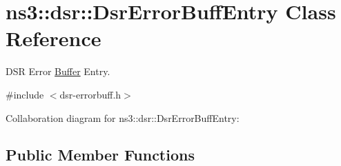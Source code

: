 \hypertarget{classns3_1_1dsr_1_1DsrErrorBuffEntry}{}\section{ns3\+:\+:dsr\+:\+:Dsr\+Error\+Buff\+Entry Class Reference}
\label{classns3_1_1dsr_1_1DsrErrorBuffEntry}


D\+SR Error \hyperlink{classns3_1_1Buffer}{Buffer} Entry.  




{\ttfamily \#include $<$dsr-\/errorbuff.\+h$>$}



Collaboration diagram for ns3\+:\+:dsr\+:\+:Dsr\+Error\+Buff\+Entry\+:
\subsection*{Public Member Functions}
